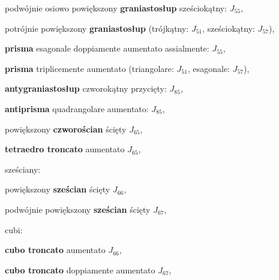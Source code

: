 \begin{compactitem}
\begin{compactitem}
\begin{compactitem}
\begin{compactitem}
\begin{compactitem}
\begin{compactitem}
\begin{compactitem}
\begin{compactitem}
\begin{compactitem}
        \item podwójnie osiowo powiększony \textbf{graniastosłup} sześciokątny: $J_{55}$, %
        \item potrójnie powiększony \textbf{graniastosłup} (trójkątny: $J_{51}$, sześciokątny: $J_{57}$), %
        \item \textbf{prisma} esagonale doppiamente aumentato assialmente: $J_{55}$, %
        \item \textbf{prisma} triplicemente aumentato (triangolare: $J_{51}$, esagonale: $J_{57}$), %
    \end{compactitem}

    \item \textbf{antygraniastosłup} czworokątny przycięty: $J_{85}$, %
    \item \textbf{antiprisma} quadrangolare aumentato: $J_{85}$, %

    \item powiększony \textbf{czworościan} ścięty $J_{65}$, %
    \item \textbf{tetraedro troncato} aumentato $J_{65}$, %

    \item sześciany: \begin{compactitem} %
        \item powiększony \textbf{sześcian} ścięty $J_{66}$, %
        \item podwójnie powiększony \textbf{sześcian} ścięty $J_{67}$, %
    \item cubi: \begin{compactitem} %
        \item \textbf{cubo troncato} aumentato $J_{66}$, %
        \item \textbf{cubo troncato} doppiamente aumentato $J_{67}$, %
    \end{compactitem}


\end{compactitem}
\end{compactitem}
\end{compactitem}
\end{compactitem}
\end{compactitem}
\end{compactitem}
\end{compactitem}
\end{compactitem}
\end{compactitem}
